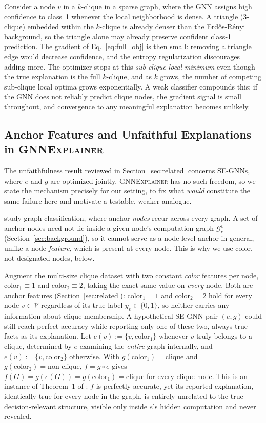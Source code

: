 \documentclass{article}
\newcommand{\GNNEx}{\textsc{GNNExplainer}\xspace}
\newcommand{\calG}{\mathcal{G}}
\newcommand{\calV}{\mathcal{V}}
\theoremstyle{definition}
\begin{document}
Consider a node $v$ in a $k$-clique in a sparse graph, where the GNN assigns
high confidence to class~1 whenever the local neighborhood is dense. A
triangle (3-clique) embedded within the $k$-clique is already denser than
the Erd\H{o}s-R\'{e}nyi \citep{erdos1959random} background, so the triangle
alone may already preserve confident class-1 prediction. The gradient of
Eq.~\eqref{eq:full_obj} is then small: removing a triangle edge would
decrease confidence, and the entropy regularization discourages adding
more. The optimizer stops at this \emph{sub-clique local minimum} even
though the true explanation is the full $k$-clique, and as $k$ grows, the
number of competing sub-clique local optima grows exponentially. A weak
classifier compounds this: if the GNN does not reliably predict clique
nodes, the gradient signal is small throughout, and convergence to any
meaningful explanation becomes unlikely.

\subsection{Anchor Features and Unfaithful Explanations in \GNNEx}
\label{subsec:anchor}

The unfaithfulness result reviewed in Section~\ref{sec:related} concerns
SE-GNNs, where $e$ and $g$ are optimized jointly. \GNNEx has no such
freedom, so we state the mechanism precisely for our setting, to fix what
\emph{would} constitute the same failure here and motivate a testable,
weaker analogue.

\citet{azzolin2026gnnexplanations} study graph classification, where anchor
\emph{nodes} recur across every graph. A set of anchor nodes need not lie
inside a given node's computation graph $\calG_c^v$ (Section~\ref{sec:background}),
so it cannot serve as a node-level anchor in general, unlike a node
\emph{feature}, which is present at every node. This is why we use color,
not designated nodes, below.

Augment the multi-size clique dataset with two constant \emph{color}
features per node, $\text{color}_1 \equiv 1$ and $\text{color}_2 \equiv 2$,
taking the exact same value on \emph{every} node. Both are anchor features
(Section~\ref{sec:related}): $\text{color}_1 = 1$ and $\text{color}_2 = 2$
hold for every node $v \in \calV$ regardless of its true label
$y_v \in \{0,1\}$, so neither carries any information about clique
membership. A hypothetical SE-GNN pair $(e,g)$ could still reach perfect
accuracy while reporting only one of these two, always-true facts as its
explanation. Let $e(v) := \{v,\text{color}_1\}$ whenever $v$ truly belongs
to a clique, determined by $e$ examining the \emph{entire} graph internally,
and $e(v) := \{v,\text{color}_2\}$ otherwise. With
$g(\text{color}_1)=\text{clique}$ and $g(\text{color}_2)=\text{non-clique}$,
$f=g\circ e$ gives $f(G) = g(e(G)) = g(\text{color}_1) = \text{clique}$ for
every clique node. This is an instance of Theorem~1 of
\citet{azzolin2026gnnexplanations}: $f$ is perfectly accurate, yet its
reported explanation, identically true for every node in the graph, is
entirely unrelated to the true decision-relevant structure, visible only
inside $e$'s hidden computation and never revealed.
\end{document}
